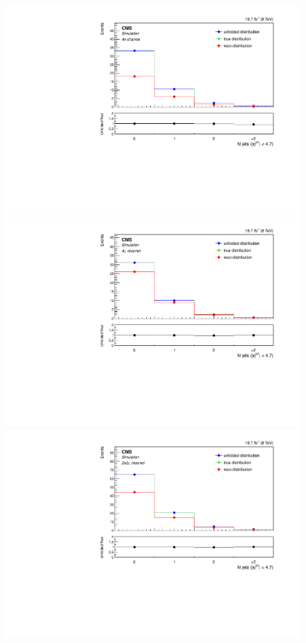 \begin{figure}[hbtp]
\begin{center}
    \includegraphics[width=0.8\cmsFigWidth]{Figures/Unfolding/MCTests/Jets_ZZTo4e_PowMatrix_PowDistr_HalfSample_fr}     
    \includegraphics[width=0.8\cmsFigWidth]{Figures/Unfolding/MCTests/Jets_ZZTo4m_PowMatrix_PowDistr_HalfSample_fr}     
 \includegraphics[width=0.8\cmsFigWidth]{Figures/Unfolding/MCTests/Jets_ZZTo2e2m_PowMatrix_PowDistr_HalfSample_fr}        

\end{center}
\end{figure}

